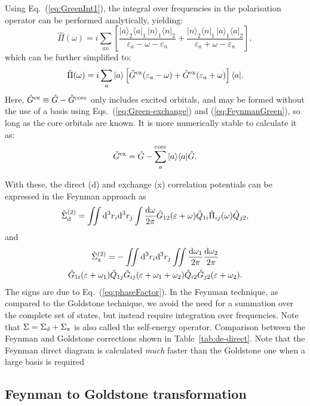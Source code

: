 \documentclass[10pt,twocolumn,a4paper]{article}%
\newcommand{\bra}[1]{\ensuremath{\langle #1|}}	%
\newcommand{\ket}[1]{\ensuremath{|#1\rangle}}	%
\newcommand{\be}{\begin{equation}}
\newcommand{\ee}{\end{equation}}
\def\d{\ensuremath{{\rm d}}}
\def\en{\ensuremath{\varepsilon}}
\newcommand{\w}{\ensuremath{\omega}}
\begin{document}
Using Eq.~(\ref{eq:GreenInt1}), the integral over frequencies in the polarisation operator can be performed analytically, yielding:
\be\label{eq:PiGreen2}
\hat\Pi(\w) = i\sum_{an}\left[
\frac{\ket{a}_2\bra{a}_1 \, \ket{n}_1\bra{n}_2}{\en_a-\w-\en_n}
+
\frac{\ket{n}_2\bra{n}_1 \, \ket{a}_1\bra{a}_2}{\en_a+\w-\en_n}
\right],
\ee
which can be further simplified to:
\be\label{eq:PiGreen}
\hat\Pi(\w) = i\sum_a \ket{a}\left[\hat G^{\rm ex}(\en_a -\w) +  \hat G^{\rm ex}(\en_a +\w)\right]\bra{a}.
\ee
Here, $\hat G^{\rm ex}\equiv\hat G-\hat G^{\rm core}$ only includes excited orbitals, and may be formed without the use of a basis using Eqs.~(\ref{eq:Green-exchange}) and (\ref{eq:FeynmanGreen}), so long as the core orbitals are known.
It is more numerically stable to calculate it as:
\be\label{eq:Gex}
\hat G^{\rm ex} =  \hat G - \sum_a^{\rm core} \ket{a}\bra{a}\hat G.
\ee


With these, the direct (d) and exchange (x) correlation potentials can be expressed in the Feynman approach as
\be\label{eq:FeynDir}
\hat\Sigma^{(2)}_{\rm d}
= \iint\d^3 r_i\d^3 r_j
\int\frac{\d\w}{2\pi}\hat G_{12}(\en+\w)\hat Q_{1i}\hat\Pi_{ij}(\w)\hat Q_{j2},
\ee
and
\begin{multline}\label{eq:FeynExch}
\hat\Sigma^{(2)}_{\rm x}
= -\iint\d^3 r_i\d^3 r_j
\iint\frac{\d\w_1}{2\pi}\frac{\d\w_2}{2\pi}\\
\hat G_{1i}(\en+\w_1)\hat Q_{1j} \hat G_{ij}(\en+\w_1+\w_2)\hat Q_{i2}\hat G_{j2}(\en+\w_2).
\end{multline}
The signs are due to Eq.~(\ref{eq:phaseFactor}).
In the Feynman technique, as compared to the Goldstone technique, we avoid the need for a summation over the complete set of states, but instead require integration over frequencies.
Note that $\Sigma = \Sigma_{\rm d} + \Sigma_{\rm x}$ is also called the self-energy operator.
Comparison between the Feynman and Goldstone corrections shown in Table~\ref{tab:de-direct}.
Note that the Feynman direct diagram is calculated {\em much} faster than the Goldstone one when a large basis is required




\subsection{Feynman to Goldstone transformation}
\end{document}
